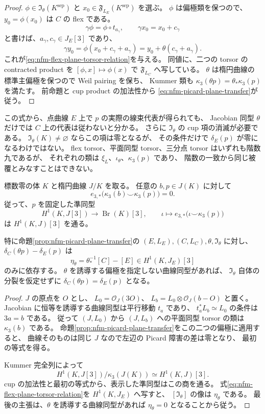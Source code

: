 \begin{proof}
$\phi\in\mathfrak I_\theta(K^{\mathrm{sep}})$ と
$x_0\in\mathfrak F_{L_E}(K^{\mathrm{sep}})$ を選ぶ。
$\phi$ は偏極類を保つので、$y_0=\phi(x_0)$ は $C$ の flex である。
\[
 \gamma\phi=\phi\circ t_{a_\gamma},\qquad
 \gamma x_0=x_0+c_\gamma
\]
と書けば、$a_\gamma,c_\gamma\in J_E[3]$ であり、
\[
 \gamma y_0
   =\phi(x_0+c_\gamma+a_\gamma)
   =y_0+\theta(c_\gamma+a_\gamma).
\]
これが\eqref{eq:nfm-flex-plane-torsor-relation}を与える。
同値に、二つの torsor の contracted product を
$[\phi,x]\mapsto\phi(x)$ で $\mathfrak F_{L_C}$ へ写している。
$\theta$ は楕円曲線の標準主偏極を保つので Weil pairing を保ち、
Kummer 類も $\kappa_3(\theta p)=\theta_*\kappa_3(p)$ を満たす。
前命題と cup product の加法性から
\eqref{eq:nfm-picard-plane-transfer}が従う。
\end{proof}

この式から、点曲線 $E$ 上で $p$ の実際の線束代表が得られても、
Jacobian 同型 $\theta$ だけでは $C$ 上の代表は従わないと分かる。
さらに $\mathfrak I_\theta$ の cup 項の消滅が必要である。
$\mathfrak I_\theta(K)\ne\varnothing$ ならこの項は零となるが、
その条件だけで $\delta_E(p)$ が零になるわけではない。
flex torsor、平面同型 torsor、三分点 torsor はいずれも階数九であるが、
それぞれの類は $\xi_L$、$\iota_\theta$、$\kappa_3(p)$ であり、
階数の一致から同じ被覆とみなすことはできない。

\begin{lemma}
\label{lem:nfm-picard-torsor-quotient}
標数零の体 $K$ と楕円曲線 $J/K$ を取る。
任意の $b,p\in J(K)$ に対して
\[
 e_{3,*}\bigl(\kappa_3(b)\smile\kappa_3(p)\bigr)=0.
\]
従って、$p$ を固定した準同型
\[
 H^1(K,J[3])\longrightarrow\operatorname{Br}(K)[3],
 \qquad \iota\longmapsto e_{3,*}\bigl(\iota\smile\kappa_3(p)\bigr)
\]
は $H^1(K,J)[3]$ を通る。

特に命題\ref{prop:nfm-picard-plane-transfer}の
$(E,L_E),(C,L_C),\theta,\mathfrak I_\theta$ に対し、
$\delta_C(\theta p)-\delta_E(p)$ は
\[
 \eta_\theta=\theta^{-1}_*[C]-[E]\in H^1(K,J_E)[3]
\]
のみに依存する。
$\theta$ を誘導する偏極を指定しない曲線同型があれば、
$\mathfrak I_\theta$ 自体の分裂を仮定せずに
$\delta_C(\theta p)=\delta_E(p)$ となる。
\end{lemma}

\begin{proof}
$J$ の原点を $O$ とし、
$L_0=\mathcal O_J(3O)$、
$L_b=L_0\otimes\mathcal O_J(b-O)$ と置く。
Jacobian に恒等を誘導する曲線同型は平行移動 $t_a$ であり、
$t_a^*L_b\simeq L_0$ の条件は $3a=b$ である。
従って $(J,L_0)$ から $(J,L_b)$ への平面同型 torsor の類は
$\kappa_3(b)$ である。
命題\ref{prop:nfm-picard-plane-transfer}をこの二つの偏極に適用すると、
曲線そのものは同じ $J$ なので左辺の Picard 障害の差は零となり、
最初の等式を得る。

Kummer 完全列によって
\[
 H^1(K,J[3])/\kappa_3(J(K))\simeq H^1(K,J)[3].
\]
cup の加法性と最初の等式から、表示した準同型はこの商を通る。
式\eqref{eq:nfm-flex-plane-torsor-relation}を $H^1(K,J_E)$ へ写すと、
$[\mathfrak I_\theta]$ の像は $\eta_\theta$ である。
最後の主張は、$\theta$ を誘導する曲線同型があれば
$\eta_\theta=0$ となることから従う。
\end{proof}

